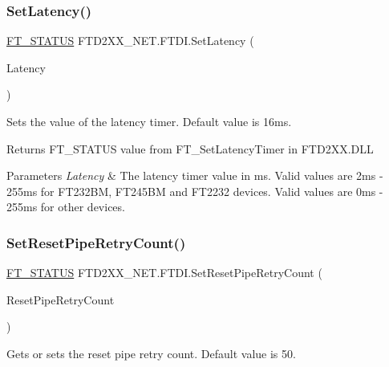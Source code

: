 \subsubsection{\texorpdfstring{SetLatency()}{SetLatency()}}
{\footnotesize\ttfamily \mbox{\hyperlink{class_f_t_d2_x_x___n_e_t_1_1_f_t_d_i_aabe20ad905cc4ccc1e35dd5b877d9a83}{F\+T\+\_\+\+S\+T\+A\+T\+US}} F\+T\+D2\+X\+X\+\_\+\+N\+E\+T.\+F\+T\+D\+I.\+Set\+Latency (\begin{DoxyParamCaption}\item[{byte}]{Latency }\end{DoxyParamCaption})}



Sets the value of the latency timer. Default value is 16ms. 

\begin{DoxyReturn}{Returns}
F\+T\+\_\+\+S\+T\+A\+T\+US value from F\+T\+\_\+\+Set\+Latency\+Timer in F\+T\+D2\+X\+X.\+D\+LL
\end{DoxyReturn}

\begin{DoxyParams}{Parameters}
{\em Latency} & The latency timer value in ms. Valid values are 2ms -\/ 255ms for F\+T232\+BM, F\+T245\+BM and F\+T2232 devices. Valid values are 0ms -\/ 255ms for other devices.\\
\hline
\end{DoxyParams}
\mbox{\label{class_f_t_d2_x_x___n_e_t_1_1_f_t_d_i_ac395991fa146bdfa6de574350441b2d5}} 
\subsubsection{\texorpdfstring{SetResetPipeRetryCount()}{SetResetPipeRetryCount()}}
{\footnotesize\ttfamily \mbox{\hyperlink{class_f_t_d2_x_x___n_e_t_1_1_f_t_d_i_aabe20ad905cc4ccc1e35dd5b877d9a83}{F\+T\+\_\+\+S\+T\+A\+T\+US}} F\+T\+D2\+X\+X\+\_\+\+N\+E\+T.\+F\+T\+D\+I.\+Set\+Reset\+Pipe\+Retry\+Count (\begin{DoxyParamCaption}\item[{U\+Int32}]{Reset\+Pipe\+Retry\+Count }\end{DoxyParamCaption})}



Gets or sets the reset pipe retry count. Default value is 50. 

